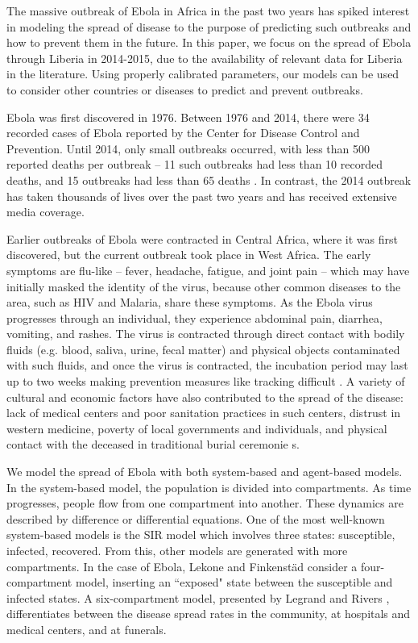 The massive outbreak of Ebola in Africa in the past two years has spiked interest in modeling the spread of disease to the purpose of predicting such outbreaks and how to prevent them in the future. In this paper, we focus on the spread of Ebola through Liberia in 2014-2015, due to the availability of relevant data for Liberia in the literature. Using properly calibrated parameters, our models can be used to consider other countries or diseases to predict and prevent outbreaks.

Ebola was first discovered in 1976. Between 1976 and 2014, there were 34 recorded cases of Ebola reported by the Center for Disease Control and Prevention. Until 2014, only small outbreaks occurred, with less than 500 reported deaths per outbreak -- 11 such outbreaks had less than 10 recorded deaths, and 15 outbreaks had less than 65 deaths \cite{CDCOutbreaks}. In contrast, the 2014 outbreak has taken thousands of lives over the past two years and has received extensive media coverage.

Earlier outbreaks of Ebola were contracted in Central Africa, where it was first discovered, but the current outbreak took place in West Africa. The early symptoms are flu-like -- fever, headache, fatigue, and joint pain -- which may have initially masked the identity of the virus, because other common diseases to the area, such as HIV and Malaria, share these symptoms. As the Ebola virus progresses through an individual, they experience abdominal pain, diarrhea, vomiting, and rashes. The virus is contracted through direct contact with bodily fluids (e.g. blood, saliva, urine, fecal matter) and physical objects contaminated with such fluids, and once the virus is contracted, the incubation period may last up to two weeks making prevention measures like tracking difficult \cite{CDCSympt}. A variety of cultural and economic factors have also contributed to the spread of the disease: lack of medical centers and poor sanitation practices in such centers, distrust in western medicine, poverty of local governments and individuals, and physical contact with the deceased in traditional burial ceremonie s\cite{WHOReasons}.

We model the spread of Ebola with both system-based and agent-based models. In the system-based model, the population is divided into compartments. As time progresses, people flow from one compartment into another. These dynamics are described by difference or differential equations. One of the most well-known system-based models is the SIR model which involves three states: susceptible, infected, recovered. From this, other models are generated with more compartments. In the case of Ebola, Lekone and Finkenstäd \cite{Lekone2006} consider a four-compartment model, inserting an ``exposed" state between the susceptible and infected states. A six-compartment model, presented by Legrand \cite{Legrand2007} and Rivers \cite{Rivers2014}, differentiates between the disease spread rates in the community, at hospitals and medical centers, and at funerals.


